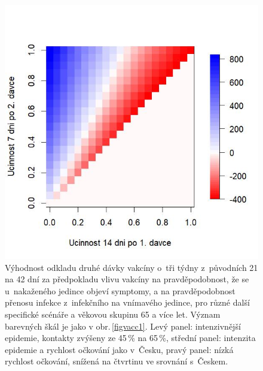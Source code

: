 \begin{figure}[p]
\begin{center}
\begin{minipage}[m]{0.3\linewidth}
		\end{minipage}
		\begin{minipage}[m]{0.3\linewidth}
			\includegraphics[width=\textwidth]{pic/SA4lessL_DIFF_mean_T.jpg}
		\end{minipage}
	\end{center}
	\caption{Výhodnost odkladu druhé dávky vakcíny o~tři týdny z~původních 21 na 42 dní za předpokladu vlivu vakcíny na pravděpodobnost, že se u~nakaženého jedince objeví symptomy, a na pravděpodobnost přenosu infekce z~infekčního na vnímavého jedince, pro různé další specifické scénáře a věkovou skupinu 65 a více let. Význam barevných škál je jako v obr.\,\ref{figvacc1}. Levý panel: intenzivnější epidemie, kontakty zvýšeny ze 45\,\% na 65\,\%, střední panel: intenzita epidemie a rychlost očkování jako v~Česku, pravý panel: nízká rychlost očkování, snížená na čtvrtinu ve srovnání s~Českem.}
	\label{figvacc3}
\end{figure}



